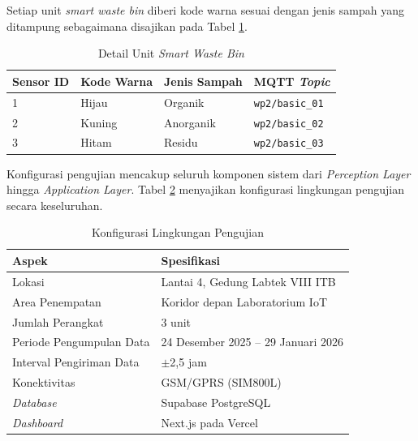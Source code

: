 Setiap unit \textit{smart waste bin} diberi kode warna sesuai dengan jenis sampah yang ditampung sebagaimana disajikan pada Tabel \ref{tab:detail-unit-swb}.

\begin{table}[H]
  \caption{Detail Unit \textit{Smart Waste Bin}}
  \label{tab:detail-unit-swb}
  \centering
  \begin{tabular}{| l | l | l | l |}
    \hline
    \textbf{Sensor ID} & \textbf{Kode Warna} & \textbf{Jenis Sampah} & \textbf{MQTT \textit{Topic}} \\
    \hline
    1 & Hijau  & Organik   & \texttt{wp2/basic\_01} \\
    \hline
    2 & Kuning & Anorganik & \texttt{wp2/basic\_02} \\
    \hline
    3 & Hitam  & Residu    & \texttt{wp2/basic\_03} \\
    \hline
  \end{tabular}
\end{table}

Konfigurasi pengujian mencakup seluruh komponen sistem dari \textit{Perception Layer} hingga \textit{Application Layer}. Tabel \ref{tab:konfigurasi-lingkungan} menyajikan konfigurasi lingkungan pengujian secara keseluruhan.

\begin{table}[H]
  \caption{Konfigurasi Lingkungan Pengujian}
  \label{tab:konfigurasi-lingkungan}
  \begin{tabularx}{\textwidth}{| l | X |}
    \hline
    \textbf{Aspek} & \textbf{Spesifikasi} \\
    \hline
    Lokasi & Lantai 4, Gedung Labtek VIII ITB \\
    \hline
    Area Penempatan & Koridor depan Laboratorium IoT \\
    \hline
    Jumlah Perangkat & 3 unit \\
    \hline
    Periode Pengumpulan Data & 24 Desember 2025 -- 29 Januari 2026 \\
    \hline
    Interval Pengiriman Data & $\pm$2,5 jam \\
    \hline
    Konektivitas & GSM/GPRS (SIM800L) \\
    \hline
    \textit{Database} & Supabase PostgreSQL \\
    \hline
    \textit{Dashboard} & Next.js pada Vercel \\
    \hline
  \end{tabularx}
\end{table}

